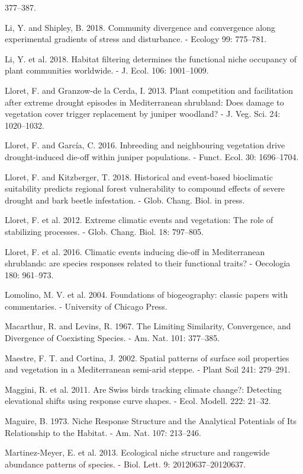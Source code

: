 \documentclass[11pt,twoside]{reedthesis}
\begin{document}
377--387.\par
Li, Y. and Shipley, B. 2018. Community divergence and convergence along
experimental gradients of stress and disturbance. - Ecology 99:
775--781.\par
Li, Y. et al. 2018. Habitat filtering determines the functional niche
occupancy of plant communities worldwide. - J. Ecol. 106:
1001--1009.\par
Lloret, F. and Granzow-de la Cerda, I. 2013. Plant competition and
facilitation after extreme drought episodes in Mediterranean shrubland:
Does damage to vegetation cover trigger replacement by juniper woodland?
- J. Veg. Sci. 24: 1020--1032.\par
Lloret, F. and García, C. 2016. Inbreeding and neighbouring vegetation
drive drought-induced die-off within juniper populations. - Funct. Ecol.
30: 1696--1704.\par
Lloret, F. and Kitzberger, T. 2018. Historical and event-based
bioclimatic suitability predicts regional forest vulnerability to
compound effects of severe drought and bark beetle infestation. - Glob.
Chang. Biol. in press.\par
Lloret, F. et al. 2012. Extreme climatic events and vegetation: The role
of stabilizing processes. - Glob. Chang. Biol. 18: 797--805.\par
Lloret, F. et al. 2016. Climatic events inducing die-off in
Mediterranean shrublands: are species responses related to their
functional traits? - Oecologia 180: 961--973.\par
Lomolino, M. V. et al. 2004. Foundations of biogeography: classic papers
with commentaries. - University of Chicago Press.\par
Macarthur, R. and Levins, R. 1967. The Limiting Similarity, Convergence,
and Divergence of Coexisting Species. - Am. Nat. 101: 377--385.\par
Maestre, F. T. and Cortina, J. 2002. Spatial patterns of surface soil
properties and vegetation in a Mediterranean semi-arid steppe. - Plant
Soil 241: 279--291.\par
Maggini, R. et al. 2011. Are Swiss birds tracking climate change?:
Detecting elevational shifts using response curve shapes. - Ecol.
Modell. 222: 21--32.\par
Maguire, B. 1973. Niche Response Structure and the Analytical Potentials
of Its Relationship to the Habitat. - Am. Nat. 107: 213--246.\par
Martinez-Meyer, E. et al. 2013. Ecological niche structure and rangewide
abundance patterns of species. - Biol. Lett. 9: 20120637--20120637.\par
\end{document}
